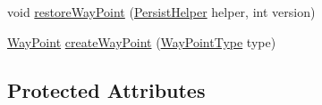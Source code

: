 \begin{DoxyCompactItemize}
\item 
void \hyperlink{classorg_1_1tzi_1_1use_1_1gui_1_1views_1_1diagrams_1_1elements_1_1edges_1_1_edge_base_aa0b94a9c42d90cd535e2ff219960d580}{restore\-Way\-Point} (\hyperlink{classorg_1_1tzi_1_1use_1_1gui_1_1util_1_1_persist_helper}{Persist\-Helper} helper, int version)
\item 
\hyperlink{classorg_1_1tzi_1_1use_1_1gui_1_1views_1_1diagrams_1_1waypoints_1_1_way_point}{Way\-Point} \hyperlink{classorg_1_1tzi_1_1use_1_1gui_1_1views_1_1diagrams_1_1elements_1_1edges_1_1_edge_base_a7319a931e4263fb56ab5594dc02805c0}{create\-Way\-Point} (\hyperlink{enumorg_1_1tzi_1_1use_1_1gui_1_1views_1_1diagrams_1_1waypoints_1_1_way_point_type}{Way\-Point\-Type} type)
\end{DoxyCompactItemize}
\subsection*{Protected Attributes}
